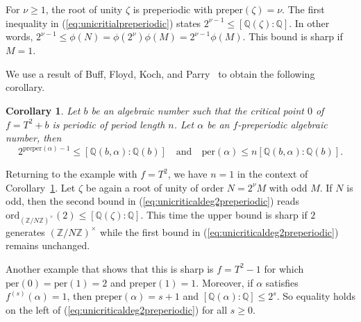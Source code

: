 \documentclass[12pt,oneside,a4]{amsart}
\newcommand{\IQ}{\mathbb{Q}}
\newcommand{\IZ}{\mathbb{Z}}
\newcounter{maincounter}
\numberwithin{maincounter}{section}
\numberwithin{equation}{section}
\newtheorem{corollary}[maincounter]{Corollary}
\begin{document}
For $\nu \ge 1$, the root of unity $\zeta$ is preperiodic with
$\mathrm{preper}(\zeta) = \nu$.
The first inequality in (\ref{eq:unicritialpreperiodic})
states $2^{\nu-1}\le [\IQ(\zeta):\IQ]$. In other words,
$2^{\nu-1}\le \phi(N)=\phi(2^\nu)\phi(M) = 2^{\nu-1}\phi(M)$. This
bound is sharp  if $M=1$. 

We use a result of Buff, Floyd, Koch, and Parry~\cite{BFKP:Gleason} to
obtain the following corollary. 


\begin{corollary}
  \label{cor:unicritialdeg2preperiodic}
  Let $b$ be an algebraic number such that the critical point $0$
  of $f = T^2 + b$ is periodic of period length $n$. Let
  $\alpha$ be an
  $f$-preperiodic algebraic number, then
  \begin{equation}
    \label{eq:unicriticaldeg2preperiodic}
    2^{\mathrm{preper}(\alpha)-1} \le [\IQ(b,\alpha):\IQ(b)]
    \quad\text{and}\quad \mathrm{per}(\alpha) \le
    n[\IQ(b,\alpha):\IQ(b)].
  \end{equation}
\end{corollary}

Returning to the example with $f=T^2$, we have $n=1$ in the context of
Corollary~\ref{cor:unicritialdeg2preperiodic}. Let $\zeta$ be again a
root of unity of order $N=2^\nu M$ with odd $M$. If $N$ is odd, then
the second bound in (\ref{eq:unicriticaldeg2preperiodic}) reads
$\mathrm{ord}_{(\IZ/N\IZ)^\times}(2) \le [\IQ(\zeta):\IQ]$. This time
the upper bound is sharp if $2$ generates $(\IZ/N\IZ)^\times$
while the first bound in (\ref{eq:unicriticaldeg2preperiodic})
remains unchanged.

Another example that shows that this is sharp is $f = T^2 -1$ for
which $\mathrm{per}(0) = \mathrm{per}(1) = 2$ and $\mathrm{preper}(1)
= 1$.
Moreover, if $\alpha$ satisfies $f^{(s)}(\alpha)=1$, then
$\mathrm{preper}(\alpha) = s+1$ and $[\IQ(\alpha):\IQ]\le 2^{s}$. 
So equality holds on the left of (\ref{eq:unicriticaldeg2preperiodic})
for all $s\ge 0$. 
\end{document}
